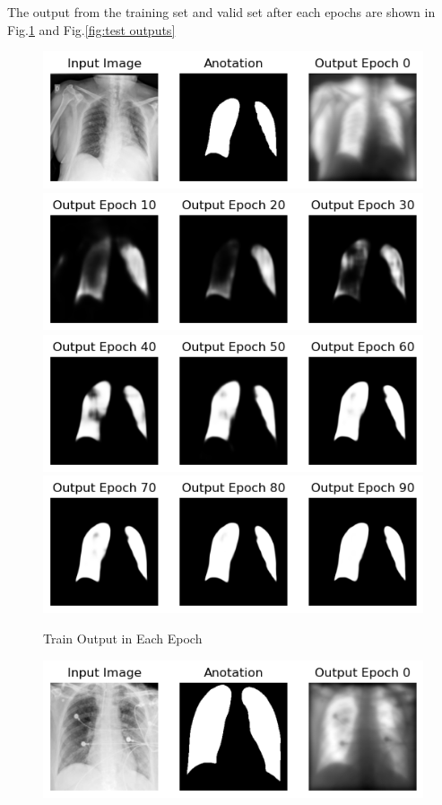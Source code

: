 \documentclass{article}
\begin{document}
\begin{multicols}{2}
The output from the training set and valid set after each epochs are shown in Fig.\ref{fig:train outputs} and Fig.\ref{fig:test outputs}
\begin{figure}[H]
    \centering
    \includegraphics[width=\linewidth]{Unknown-26.png}
    \includegraphics[width=\linewidth]{Unknown-27.png}
    \includegraphics[width=\linewidth]{Unknown-28.png}
    \includegraphics[width=\linewidth]{Unknown-29.png}
    \caption{Train Output in Each Epoch}
    \label{fig:train outputs}
\end{figure}
\begin{figure}[H]
    \centering
    \includegraphics[width=\linewidth]{Unknown-31.png}

\end{figure}
\end{multicols}
\end{document}

